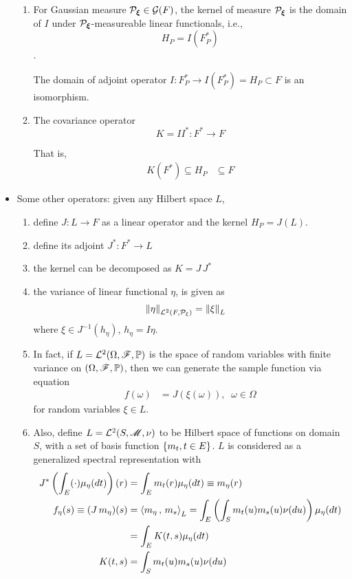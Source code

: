 \documentclass[11pt]{article}
\begin{document}
\begin{itemize}
\begin{enumerate}
\item For Gaussian measure ${\mathcal P}_{\boldsymbol{\xi}}\in {\mathcal G}(F)$, the kernel of measure ${\mathcal P}_{\boldsymbol{\xi}}$ is the domain of $I$ under ${\mathcal P}_{\boldsymbol{\xi}}$-measureable linear functionals,  i.e., $$H_{P}= I(F_{P}^{*})$$.

The domain of adjoint operator $I: F_{P}^{*} \rightarrow I(F_{P}^{*})= H_{P} \subset F$ is an isomorphism. 

\item The covariance operator $$K= II^{*}:  F^{*} \rightarrow F$$

That is, 
\begin{align*}
K(F^{*}) \subseteq H_{P}&\subseteq F
\end{align*}
\end{enumerate}


\item Some other operators: given any Hilbert space $L$, 
\begin{enumerate}
\item define $J: L \rightarrow F$ as a linear operator and the kernel $H_{P}= J(L)$. 

\item define its adjoint $J^{*}: F^{*} \rightarrow L$

\item the kernel can be decomposed as $K = J\,J^{*}$

\item the variance of linear functional $\eta$, is given as
\begin{align*}
\left\|\eta\right\|_{{\mathcal L}^{2}(F,{\mathcal P}_{\xi})} &= \left\|\xi\right\|_{L}
\end{align*}
where $\xi\in J^{-1}(h_{\eta})$, $h_{\eta}= I\eta$.

\item In fact, if $L= {\mathcal L}^{2}(\Omega, {\mathscr F}, {\mathbb P})$ is the space of random variables with finite variance on $(\Omega, {\mathscr F}, {\mathbb P})$, then we can generate the sample function via equation 
\begin{align*}
f(\omega) &= J(\xi(\omega)),\;\; \omega\in \Omega
\end{align*}
 for random variables $\xi \in L$.

\item Also, define $L = {\mathcal L}^{2}(S, {\mathscr M}, \nu)$ to be Hilbert space of functions on domain $S$, with a set of basis function $\left\{m_{t}, t\in E\right\}$. $L$ is considered as a generalized spectral representation with
\begin{align*}
J^{*}\left(\int_{E} (\cdot) \mu_{\eta}(dt) \right)(r) &= \int_{E}m_{t}(r)\mu_{\eta}(dt)\equiv m_{\eta}(r)\\
f_{\eta}(s)\equiv (J\,m_{\eta})(s) &= \left\langle m_{\eta}\,,\, m_{s} \right\rangle_{L}= \int_{E}\left(\int_{S}m_{t}(u)m_{s}(u)\nu(du) \right) \mu_{\eta}(dt)\\
&= \int_{E}K(t,s)\mu_{\eta}(dt)\\
K(t,s) &= \int_{S}m_{t}(u)m_{s}(u)\nu(du)
\end{align*}
\end{enumerate}


\end{itemize}
\newpage


\end{document}
